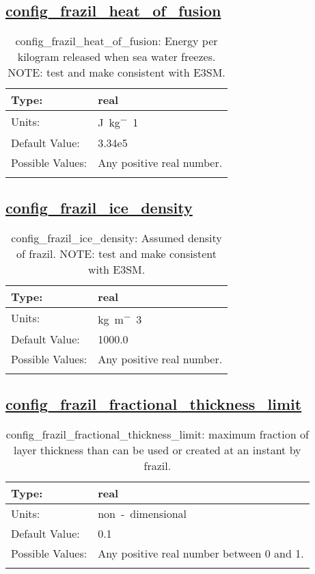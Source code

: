 \subsection[config\_frazil\_heat\_of\_fusion]{\hyperref[sec:nm_tab_frazil_ice]{config\_frazil\_heat\_of\_fusion}}
\label{subsec:nm_sec_config_frazil_heat_of_fusion}
\begin{center}
\begin{longtable}{| p{2.0in} || p{4.0in} |}
    \hline
    Type: & real \\
    \hline
    Units: & \si{J.kg^-1} \\
    \hline
    Default Value: & 3.34e5 \\
    \hline
    Possible Values: & Any positive real number. \\
    \hline
    \caption{config\_frazil\_heat\_of\_fusion: Energy per kilogram released when sea water freezes. NOTE: test and make consistent with E3SM.}
\end{longtable}
\end{center}
\subsection[config\_frazil\_ice\_density]{\hyperref[sec:nm_tab_frazil_ice]{config\_frazil\_ice\_density}}
\label{subsec:nm_sec_config_frazil_ice_density}
\begin{center}
\begin{longtable}{| p{2.0in} || p{4.0in} |}
    \hline
    Type: & real \\
    \hline
    Units: & \si{kg.m^-3} \\
    \hline
    Default Value: & 1000.0 \\
    \hline
    Possible Values: & Any positive real number. \\
    \hline
    \caption{config\_frazil\_ice\_density: Assumed density of frazil. NOTE: test and make consistent with E3SM.}
\end{longtable}
\end{center}
\subsection[config\_frazil\_fractional\_thickness\_limit]{\hyperref[sec:nm_tab_frazil_ice]{config\_frazil\_fractional\_thickness\_limit}}
\label{subsec:nm_sec_config_frazil_fractional_thickness_limit}
\begin{center}
\begin{longtable}{| p{2.0in} || p{4.0in} |}
    \hline
    Type: & real \\
    \hline
    Units: & \si{non-dimensional} \\
    \hline
    Default Value: & 0.1 \\
    \hline
    Possible Values: & Any positive real number between 0 and 1. \\
    \hline
    \caption{config\_frazil\_fractional\_thickness\_limit: maximum fraction of layer thickness than can be used or created at an instant by frazil.}
\end{longtable}
\end{center}
